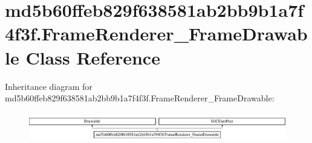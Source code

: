 \hypertarget{classmd5b60ffeb829f638581ab2bb9b1a7f4f3f_1_1FrameRenderer__FrameDrawable}{}\section{md5b60ffeb829f638581ab2bb9b1a7f4f3f.\+Frame\+Renderer\+\_\+\+Frame\+Drawable Class Reference}
\label{classmd5b60ffeb829f638581ab2bb9b1a7f4f3f_1_1FrameRenderer__FrameDrawable}
Inheritance diagram for md5b60ffeb829f638581ab2bb9b1a7f4f3f.\+Frame\+Renderer\+\_\+\+Frame\+Drawable\+:\begin{figure}[H]
\begin{center}
\leavevmode
\includegraphics[height=1.275626cm]{classmd5b60ffeb829f638581ab2bb9b1a7f4f3f_1_1FrameRenderer__FrameDrawable}
\end{center}
\end{figure}
